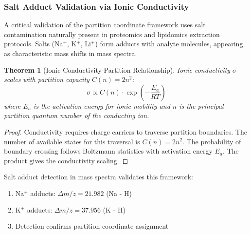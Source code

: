 \documentclass[twocolumn,10pt,a4paper]{article}
\newtheorem{theorem}{Theorem}[section]
\theoremstyle{definition}
\theoremstyle{remark}
\begin{document}
\subsubsection{Salt Adduct Validation via Ionic Conductivity}

A critical validation of the partition coordinate framework uses salt contamination naturally present in proteomics and lipidomics extraction protocols. Salts (Na$^+$, K$^+$, Li$^+$) form adducts with analyte molecules, appearing as characteristic mass shifts in mass spectra.

\begin{theorem}[Ionic Conductivity-Partition Relationship]
\label{thm:ionic_conductivity}
Ionic conductivity $\sigma$ scales with partition capacity $C(n) = 2n^2$:
\begin{equation}
    \sigma \propto C(n) \cdot \exp\left(-\frac{E_a}{RT}\right)
\end{equation}
where $E_a$ is the activation energy for ionic mobility and $n$ is the principal partition quantum number of the conducting ion.
\end{theorem}

\begin{proof}
Conductivity requires charge carriers to traverse partition boundaries. The number of available states for this traversal is $C(n) = 2n^2$. The probability of boundary crossing follows Boltzmann statistics with activation energy $E_a$. The product gives the conductivity scaling.
\end{proof}

Salt adduct detection in mass spectra validates this framework:
\begin{enumerate}
    \item Na$^+$ adducts: $\Delta m/z = 21.982$ (Na - H)
    \item K$^+$ adducts: $\Delta m/z = 37.956$ (K - H)
    \item Detection confirms partition coordinate assignment
\end{enumerate}
\end{document}
